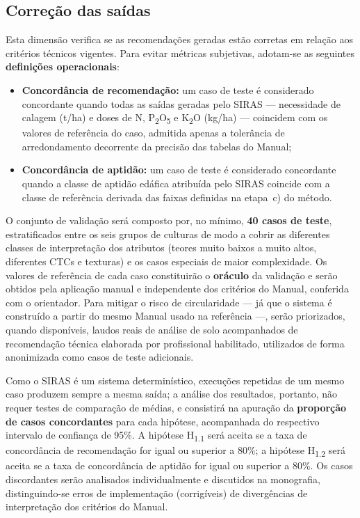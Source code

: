 \subsection{Correção das saídas}\label{sec:val_correcao}

Esta dimensão verifica se as recomendações geradas estão corretas em
relação aos critérios técnicos vigentes. Para evitar métricas
subjetivas, adotam-se as seguintes \textbf{definições operacionais}:

\begin{itemize}

  \item \textbf{Concordância de recomendação:} um caso de teste é
    considerado concordante quando todas as saídas geradas pelo SIRAS
    --- necessidade de calagem (t/ha) e doses de N,
    P\textsubscript{2}O\textsubscript{5} e
    K\textsubscript{2}O (kg/ha) --- coincidem com os valores de
    referência do caso, admitida apenas a tolerância de arredondamento
    decorrente da precisão das tabelas do Manual;

  \item \textbf{Concordância de aptidão:} um caso de teste é considerado
    concordante quando a classe de aptidão edáfica atribuída pelo SIRAS
    coincide com a classe de referência derivada das faixas definidas
    na etapa~c) do método.

\end{itemize}

O conjunto de validação será composto por, no mínimo, \textbf{40 casos
de teste}, estratificados entre os seis grupos de culturas de modo a
cobrir as diferentes classes de interpretação dos atributos (teores
muito baixos a muito altos, diferentes CTCs e texturas) e os casos
especiais de maior complexidade. Os valores de referência de cada caso
constituirão o \textbf{oráculo} da validação e serão obtidos pela
aplicação manual e independente dos critérios do Manual, conferida com
o orientador. Para mitigar o risco de circularidade --- já que o
sistema é construído a partir do mesmo Manual usado na referência ---,
serão priorizados, quando disponíveis, laudos reais de análise de solo
acompanhados de recomendação técnica elaborada por profissional
habilitado, utilizados de forma anonimizada como casos de teste
adicionais.

Como o SIRAS é um sistema determinístico, execuções repetidas de um
mesmo caso produzem sempre a mesma saída; a análise dos resultados,
portanto, não requer testes de comparação de médias, e consistirá na
apuração da \textbf{proporção de casos concordantes} para cada hipótese,
acompanhada do respectivo intervalo de confiança de 95\%. A hipótese
H\textsubscript{1.1} será aceita se a taxa de concordância de
recomendação for igual ou superior a 80\%; a hipótese
H\textsubscript{1.2} será aceita se a taxa de concordância de aptidão
for igual ou superior a 80\%. Os casos discordantes serão analisados
individualmente e discutidos na monografia, distinguindo-se erros de
implementação (corrigíveis) de divergências de interpretação dos
critérios do Manual.

